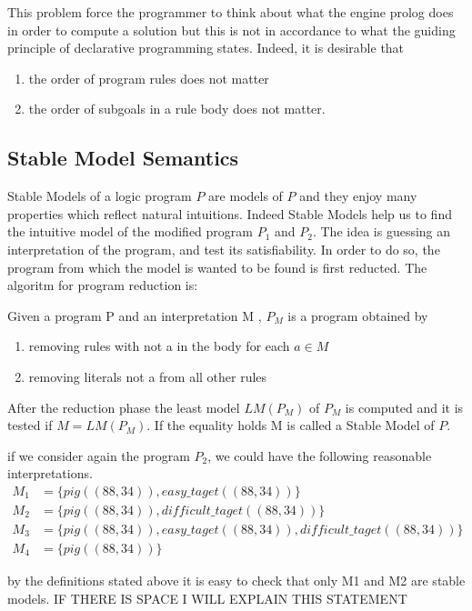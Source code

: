 This problem force the programmer to think about what the engine prolog does in order to compute a solution but this is not in accordance to what the guiding principle of declarative programming states.
Indeed, it is desirable that
\begin{enumerate}
\item the order of program rules does not matter
\item the order of subgoals in a rule body does not matter.
\end{enumerate}


\subsection{Stable Model Semantics}
Stable Models of a logic program \(P\) are models of \(P\) and they enjoy many properties which reflect natural intuitions. Indeed  Stable Models help us to find the intuitive model of the modified program \(P_1\) and \(P_2\). The idea is guessing an interpretation of the program, and test its satisfiability. In order to do so, the program from which the model is wanted to be found is first reducted. The algoritm for program reduction is:

Given a program P and an interpretation M , \(P_M\) is a program obtained by 
\begin{enumerate} 
\item removing rules with not a in the body for each \(a \in M\)
\item removing literals not a from all other rules
\end{enumerate}
After the reduction phase the least model \(LM(P_M)\) of \(P_M\) is computed and it is tested if \(M = LM(P_M)\). If the equality holds M is called a Stable Model of \(P\).

if we consider again the program \(P_2\), we could have the following reasonable interpretations.
\begin{align*}
M_1&= \{pig((88,34)), easy\_taget((88,34))\}  \\
M_2&= \{pig((88,34)), difficult\_taget((88,34))\} \\
M_3&= \{pig((88,34)), easy\_taget((88,34)), difficult\_taget((88,34))\} \\
M_4&= \{pig((88,34))\}
\end{align*}

by the definitions stated above it is easy to check that only M1 and M2 are stable models. IF THERE IS SPACE I WILL EXPLAIN THIS STATEMENT


